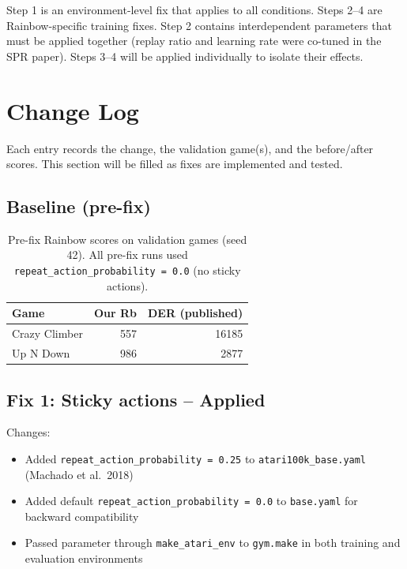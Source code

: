 \documentclass[11pt]{article}
\begin{document}
Step 1 is an environment-level fix that applies to all conditions.
Steps 2--4 are Rainbow-specific training fixes. Step 2 contains
interdependent parameters that must be applied together (replay ratio
and learning rate were co-tuned in the SPR paper). Steps 3--4 will be
applied individually to isolate their effects.

\section{Change Log}
\label{sec:changelog}

Each entry records the change, the validation game(s), and the
before/after scores. This section will be filled as fixes are
implemented and tested.

\subsection{Baseline (pre-fix)}

\begin{table}[H]
\centering
\small
\renewcommand{\arraystretch}{1.5}
\setlength{\tabcolsep}{6pt}
\begin{tabular}{l rr}
\toprule
\textbf{Game} & \textbf{Our Rb} & \textbf{DER (published)} \\
\midrule
Crazy Climber & 557   & 16185 \\
Up N Down     & 986   & 2877  \\
\bottomrule
\end{tabular}
\caption{Pre-fix Rainbow scores on validation games (seed 42).
All pre-fix runs used \texttt{repeat\_action\_probability = 0.0}
(no sticky actions).}
\end{table}

\subsection{Fix 1: Sticky actions -- Applied}

\noindent Changes:
\begin{itemize}[leftmargin=2em, itemsep=0.1em]
  \item Added \texttt{repeat\_action\_probability = 0.25} to
    \texttt{atari100k\_base.yaml} (Machado et al.\ 2018)
  \item Added default \texttt{repeat\_action\_probability = 0.0} to
    \texttt{base.yaml} for backward compatibility
  \item Passed parameter through \texttt{make\_atari\_env} to
    \texttt{gym.make} in both training and evaluation environments
\end{itemize}
\end{document}
